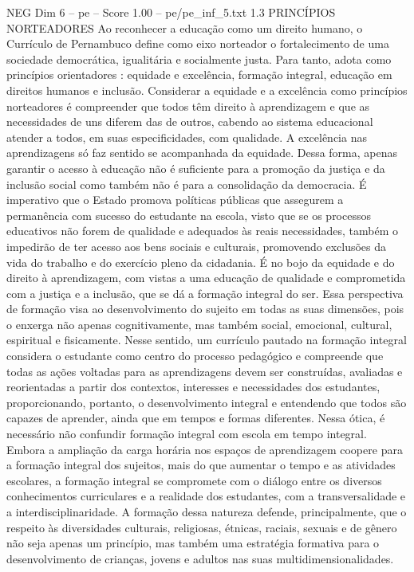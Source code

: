 \begin{textsample}{NEG Dim 6 – pe – Score 1.00 – pe/pe\_inf\_5.txt}  \label{ex:f6_neg_037}
1.3 PRINCÍPIOS NORTEADORES Ao reconhecer a educação como um direito humano, o Currículo de Pernambuco define como eixo norteador o fortalecimento de uma sociedade democrática, igualitária e socialmente justa.
Para tanto, adota como princípios orientadores : equidade e excelência, formação integral, educação em direitos humanos e inclusão.
Considerar a equidade e a excelência como princípios norteadores é compreender que todos têm direito à aprendizagem e que as necessidades de uns diferem das de outros, cabendo ao sistema educacional atender a todos, em suas especificidades, com qualidade.
A excelência nas aprendizagens só faz sentido se acompanhada da equidade.
Dessa forma, apenas garantir o acesso à educação não é suficiente para a promoção da justiça e da inclusão social como também não é para a consolidação da democracia.
É imperativo que o Estado promova políticas públicas que assegurem a permanência com sucesso do estudante na escola, visto que se os processos educativos não forem de qualidade e adequados às reais necessidades, também o impedirão de ter acesso aos bens sociais e culturais, promovendo exclusões da vida do trabalho e do exercício pleno da cidadania.
É no bojo da equidade e do direito à aprendizagem, com vistas a uma educação de qualidade e comprometida com a justiça e a inclusão, que se dá a formação integral do ser.
Essa perspectiva de formação visa ao desenvolvimento do sujeito em todas as suas dimensões, pois o enxerga não apenas cognitivamente, mas também social, emocional, cultural, espiritual e fisicamente.
Nesse sentido, um currículo pautado na formação integral considera o estudante como centro do processo pedagógico e compreende que todas as ações voltadas para as aprendizagens devem ser construídas, avaliadas e reorientadas a partir dos contextos, interesses e necessidades dos estudantes, proporcionando, portanto, o desenvolvimento integral e entendendo que todos são capazes de aprender, ainda que em tempos e formas diferentes.
Nessa ótica, é necessário não confundir formação integral com escola em tempo integral.
Embora a ampliação da carga horária nos espaços de aprendizagem coopere para a formação integral dos sujeitos, mais do que aumentar o tempo e as atividades escolares, a formação integral se compromete com o diálogo entre os diversos conhecimentos curriculares e a realidade dos estudantes, com a transversalidade e a interdisciplinaridade.
A formação dessa natureza defende, principalmente, que o respeito às diversidades culturais, religiosas, étnicas, raciais, sexuais e de gênero não seja apenas um princípio, mas também uma estratégia formativa para o desenvolvimento de crianças, jovens e adultos nas suas multidimensionalidades.

\end{textsample}

